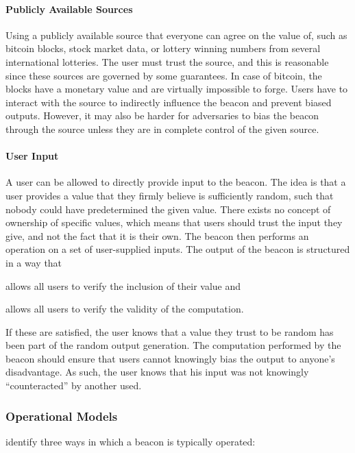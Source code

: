 \paragraph{Publicly Available Sources}
Using a publicly available source that everyone can agree on the value of, such as bitcoin blocks, stock market data, or lottery winning numbers from several international lotteries.
The user must trust the source, and this is reasonable since these sources are governed by some guarantees.
In case of bitcoin, the blocks have a monetary value and are virtually impossible to forge.
Users have to interact with the source to indirectly influence the beacon and prevent biased outputs.
However, it may also be harder for adversaries to bias the beacon through the source unless they are in complete control of the given source.

\paragraph{User Input}
A user can be allowed to directly provide input to the beacon.
The idea is that a user provides a value that they firmly believe is sufficiently random, such that nobody could have predetermined the given value.
There exists no concept of ownership of specific values, which means that users should trust the input they give, and not the fact that it is their own.
The beacon then performs an operation on a set of user-supplied inputs.
The output of the beacon is structured in a way that
\begin{eletterate*}
    \item allows all users to verify the inclusion of their value and
    \item allows all users to verify the validity of the computation.
\end{eletterate*}

If these are satisfied, the user knows that a value they trust to be random has been part of the random output generation.
The computation performed by the beacon should ensure that users cannot knowingly bias the output to anyone's disadvantage.
As such, the user knows that his input was not knowingly \enquote{counteracted} by another used.

\subsubsection{Operational Models}
 identify three ways in which a beacon is typically operated:

